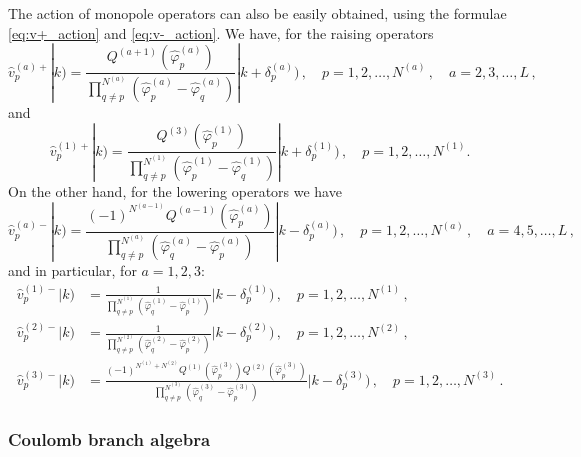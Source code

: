 \documentclass[12pt,a4paper]{article}
\renewcommand{\(}{\left(}
\renewcommand{\)}{\right)}
\renewcommand{\(}{\left(}
\renewcommand{\)}{\right)}
\begin{document}
The action of monopole operators can also be easily obtained, using the formulae \eqref{eq:v+_action} and \eqref{eq:v-_action}. 
We have, for the raising operators
\begin{equation}
\hat{v}^{(a)+}_p|k)=\frac{Q^{(a+1)}(\hat{\varphi}^{(a)}_p)}{\prod_{q\neq p}^{N^{(a)}}(\hat{\varphi}^{(a)}_p-\hat{\varphi}^{(a)}_q)}|k+\delta^{(a)}_p)\,,\quad p=1,2,\dots,N^{(a)}\,,\quad a=2,3,\dots,L\,,
\end{equation}
and 
\begin{equation}
\hat{v}^{(1)+}_p|k)=\frac{Q^{(3)}(\hat{\varphi}^{(1)}_p)}{\prod_{q\neq p}^{N^{(1)}}(\hat{\varphi}^{(1)}_p-\hat{\varphi}^{(1)}_q)}|k+\delta^{(1)}_p)\,,\quad p=1,2,\dots,N^{(1)}.
\end{equation}
On the other hand, for the lowering operators we have
\begin{equation}
\hat{v}^{(a)-}_p|k)=\frac{(-1)^{N^{(a-1)}}Q^{(a-1)}(\hat{\varphi}^{(a)}_p)}{\prod_{q\neq p}^{N^{(a)}}(\hat{\varphi}^{(a)}_q-\hat{\varphi}^{(a)}_p)}|k-\delta^{(a)}_p)\,,\quad p=1,2,\dots,N^{(a)}\,,\quad a=4,5,\dots,L\,,
\end{equation}
and in particular, for $a=1,2,3$:
\begin{equation}
\begin{aligned}
\hat{v}^{(1)-}_p|k)&=\frac{1}{\prod_{q\neq p}^{N^{(1)}}(\hat{\varphi}^{(1)}_q-\hat{\varphi}^{(1)}_p)}|k-\delta^{(1)}_p)\,,\quad p=1,2,\dots,N^{(1)}\,,\\
\hat{v}^{(2)-}_p|k)&=\frac{1}{\prod_{q\neq p}^{N^{(2)}}(\hat{\varphi}^{(2)}_q-\hat{\varphi}^{(2)}_p)}|k-\delta^{(2)}_p)\,,\quad p=1,2,\dots,N^{(2)}\,,\\
\hat{v}^{(3)-}_p|k)&=\frac{(-1)^{N^{(1)}+N^{(2)}}Q^{(1)}(\hat{\varphi}^{(3)}_p)Q^{(2)}(\hat{\varphi}^{(3)}_p)}{\prod_{q\neq p}^{N^{(3)}}(\hat{\varphi}^{(3)}_q-\hat{\varphi}^{(3)}_p)}|k-\delta^{(3)}_p)\,,\quad p=1,2,\dots,N^{(3)}\,.
\end{aligned}
\end{equation}


\subsubsection{Coulomb branch algebra}\label{sssec:coulomb_branch_algebra}
\end{document}
